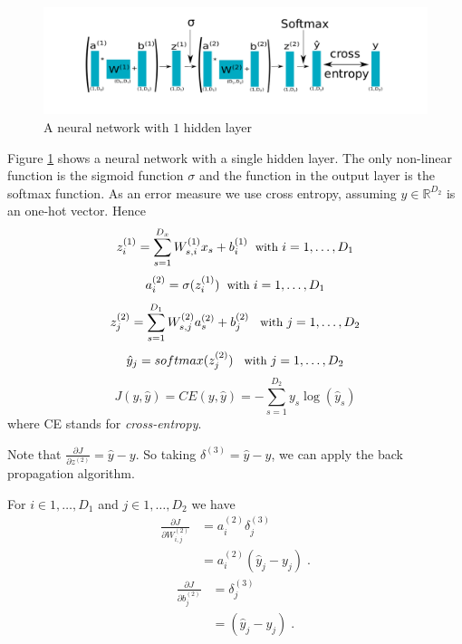\documentclass{article}
\begin{document}
\begin{figure}
\begin{center}
\includegraphics[scale=0.85]{example.pdf}
\end{center}
\caption{A neural network with $1$ hidden layer}
\label{example}
\end{figure}
Figure \ref{example} shows a neural network with a single hidden layer. The only non-linear function is the sigmoid function $\sigma$ and the function in the output layer is the softmax function. As an error measure we use cross entropy, assuming $y \in \mathbb{R}^{D_2}$ is an one-hot vector. Hence
\begin{equation}\label{eq:12}
z^{(1)}_i = \sum_{s=1}^{D_{x}}W^{(1)}_{s,i} x_{s} + b^{(1)}_{i}  \; {\small \text{ with }i = 1, \dots, D_{1}}
\end{equation}
\begin{equation}\label{eq:13}
a^{(2)}_i = \sigma(z^{(1)}_i )  \; {\small \text{ with }i = 1, \dots,D_{1}}
\end{equation}
\begin{equation}\label{eq:14}
z^{(2)}_j = \sum_{s=1}^{D_{1}}W^{(2)}_{s,j} a^{(2)}_{s} + b^{(2)}_{j} \;\; {\small \text{ with }j = 1, \dots, D_{2}}
\end{equation}
\begin{equation}\label{eq:15}
\hat{y}_j = softmax(z^{(2)}_j) \;\; {\small \text{ with }j = 1, \dots, D_{2}}
\end{equation}
\begin{equation}\label{eq:16}
J(y,\hat{y}) = CE(y,\hat{y}) = -\sum_{s=1}^{D_{2}} y_s  \log(\hat{y}_s)
\end{equation}
where CE stands for \textit{cross-entropy}.

Note that $\frac{\partial J}{\partial  z^{(2)}} = \hat{y} - y$. So taking $\delta^{(3)} = \hat{y} - y$, we can apply the back propagation algorithm.

For $i \in {1,\dots,D_{1}}$ and $j \in {1,\dots,D_{2}}$ we have
\begin{align*}
\frac{\partial J}{\partial W^{(2)}_{i,j}} & = a^{(2)}_{i}\delta^{(3)}_{j}\\
& = a^{(2)}_{i}(\hat{y}_{j} - y_{j})\; .
\end{align*}
\begin{align*}
\frac{\partial J}{\partial b^{(2)}_{j}} & = \delta^{(3)}_{j}\\
& = (\hat{y}_{j} - y_{j})\; .
\end{align*}
\end{document}
